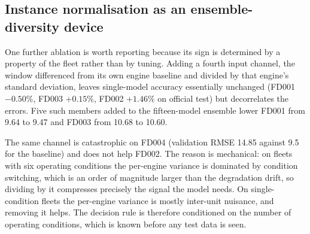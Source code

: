 
\subsection{Instance normalisation as an ensemble-diversity device}

One further ablation is worth reporting because its sign is determined by a
property of the fleet rather than by tuning. Adding a fourth input channel,
the window differenced from its own engine baseline and divided by that
engine's standard deviation, leaves single-model accuracy essentially
unchanged (FD001 $-0.50\%$, FD003 $+0.15\%$, FD002 $+1.46\%$ on official
test) but decorrelates the errors. Five such members added to the fifteen-model
ensemble lower FD001 from 9.64 to 9.47 and FD003 from 10.68 to 10.60.

The same channel is catastrophic on FD004 (validation RMSE 14.85 against 9.5
for the baseline) and does not help FD002. The reason is mechanical: on fleets
with six operating conditions the per-engine variance is dominated by condition
switching, which is an order of magnitude larger than the degradation drift, so
dividing by it compresses precisely the signal the model needs. On
single-condition fleets the per-engine variance is mostly inter-unit nuisance,
and removing it helps. The decision rule is therefore conditioned on the number
of operating conditions, which is known before any test data is seen.
